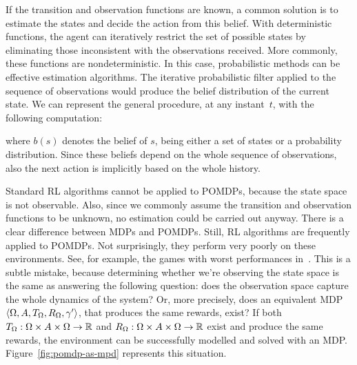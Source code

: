 If the transition and observation functions are known, a common solution is to
estimate the states and decide the action from this belief. With deterministic
functions, the agent can iteratively restrict the set of possible states by
eliminating those inconsistent with the observations received. More commonly,
these functions are nondeterministic. In this case, probabilistic methods
can be effective estimation algorithms. The iterative probabilistic filter
applied to the sequence of observations would produce the belief distribution
of the current state.  We can represent the general procedure, at any
instant~$t$, with the following computation:
\begin{center}
\end{center}
where $b(s)$ denotes the belief of $s$, being either a set of states or a
probability distribution. Since these beliefs depend on the whole sequence of
observations, also the next action is implicitly based on the whole history.

Standard RL algorithms cannot be applied to POMDPs, because the state space is
not observable. Also, since we commonly assume the transition and observation
functions to be unknown, no estimation could be carried out anyway.  There is
a clear difference between MDPs and POMDPs. Still, RL algorithms are
frequently applied to POMDPs. Not surprisingly, they perform very poorly on
these environments. See, for example, the games with worst performances
in~\cite{bib:atari-deepq-nature}. This is a subtle mistake, because
determining whether we're observing the state space is the same as answering
the following question: does the observation space capture the whole dynamics
of the system? Or, more precisely, does an equivalent MDP $\langle \Omega, A,
T_\Omega, R_\Omega, \gamma' \rangle$, that produces the same rewards, exist?
If both $T_\Omega: \Omega \times A \times \Omega \to \mathbb{R}$ and $R_\Omega: \Omega
\times A \times \Omega \to \mathbb{R}$ exist and produce the same rewards, the
environment can be successfully modelled and solved with an MDP.
Figure~\ref{fig:pomdp-as-mpd} represents this situation.

